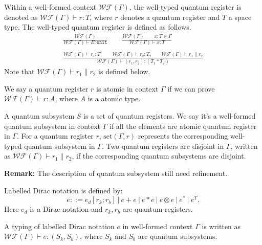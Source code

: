 \begin{definition}
  Within a well-formed context $\mathcal{WF}(\Gamma)$, the well-typed quantum register is denoted as $\mathcal{WF}(\Gamma) \vdash r : T$, where $r$ denotes a quantum register and $T$ a space type. The well-typed quantum register is defined as follows.
  \begin{gather*}
  \frac{\mathcal{WF}(\Gamma)}{\mathcal{WF}(\Gamma) \vdash E : \texttt{Unit}}
  \qquad
  \frac{\mathcal{WF}(\Gamma)\qquad x:T \in \Gamma}{\mathcal{WF}(\Gamma) \vdash x : T}\\
  \ \\  
  \frac{\mathcal{WF}(\Gamma) \vdash r_1 : T_1 \qquad \mathcal{WF}(\Gamma) \vdash r_2 : T_2\qquad \mathcal{WF}(\Gamma) \vdash r_1 \| r_2}{\mathcal{WF}(\Gamma) \vdash (r_1, r_2) : (T_1 * T_2) }
  \end{gather*}
  Note that $\mathcal{WF}(\Gamma) \vdash r_1 \| r_2$ is defined below.
\end{definition}


\begin{definition}
  We say a quantum register $r$ is atomic in context $\Gamma$ if we can prove
  $\mathcal{WF}(\Gamma) \vdash r : A$, where $A$ is a atomic type.
\end{definition}

\begin{definition}
  A quantum subsystem $S$ is a set of quantum registers. 
  We say it's a well-formed quantum subsystem in context $\Gamma$ if all the elements are atomic quantum register in $\Gamma$. 
  For a quantum register $r$, $\mathrm{set}(\Gamma, r)$ represents the corresponding well-typed quantum subsystem in $\Gamma$.
  Two quantum registers are disjoint in $\Gamma$, written as $\mathcal{WF}(\Gamma) \vdash r_1 \| r_2$, if the corresponding quantum subsystems are disjoint.
\end{definition}
\textbf{Remark:} The description of quantum subsystem still need refinement.

\begin{definition}
    Labelled Dirac notation is defined by:
    $$
    e ::= e_d [r_k; r_b]\ |\ e + e\ |\ e * e\ |\ e \otimes e\ |\ e^*\ |\ e^T.
    $$
    Here $e_d$ is a Dirac notation and $r_k, r_b$ are quantum registers.
\end{definition}

\begin{definition}
  A typing of labelled Dirac notation $e$ in well-formed context $\Gamma$ is written as $\mathcal{WF}(\Gamma) \vdash e : (S_k, S_b)$, where $S_k$ and $S_b$ are quantum subsystems. 
\end{definition}


